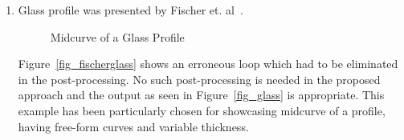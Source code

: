 \begin{enumerate}
[noitemsep,topsep=2pt,parsep=2pt,partopsep=2pt,leftmargin=*]

\item
Glass profile was presented by Fischer et. al~\cite{Elber1999}. 


\begin{figure}[h!]
\centering     %
{} \quad
{} \quad
\caption{Midcurve of a Glass Profile}
  \label{fig:midsurfcelljoin:Glassmc}
\end{figure}


Figure~\ref{fig_fischerglass} shows an erroneous loop which had to be eliminated in the post-processing. No such post-processing is needed in the proposed approach and the output as seen in Figure~\ref{fig_glass} is appropriate. This example has been particularly chosen for showcasing midcurve of a profile, having free-form curves and variable thickness.


\end{enumerate}
